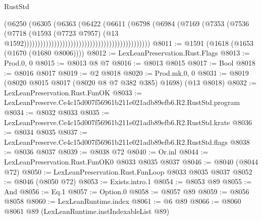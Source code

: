 \begin{lexlean}{RustStd}
\begin{coremodule}
                                                                      (@6250
                                                                        (@6305
                                                                          (@6363
                                                                            (@6422
                                                                              (@6611
                                                                                (@6798
                                                                                  (@6984
                                                                                    (@7169
                                                                                      (@7353
                                                                                        (@7536
                                                                                          (@7718
                                                                                            (@1593
                                                                                              (@7723
                                                                                                @7957)
                                                                                              (@13
                                                                                                @1592))))))))))))))))))))))))))))))))))))))))))))))
@8011 := @1591 (@1618 (@1653 (@1670 (@1680 @8006))))
@8012 := LexLeanPreservation.Rust.Flags
@8013 := Prod.{0, 0}
@8015 := @8013 @8 @7
@8016 := @8013 @8015
@8017 := Bool
@8018 := @8016 @8017
@8019 := @2 @8018
@8020 := Prod.mk.{0, 0}
@8031 := @8019 (@8020 @8015 @8017 (@8020 @8 @7 @382 @385) @1698) (@13 @8018)
@8032 := LexLeanPreservation.Rust.FunOK
@8033 := LexLeanPreserve.Ce4c15d007f56961b211e021adb89efb6.R2.RustStd.program
@8034 := @8032 @8033
@8035 := LexLeanPreserve.Ce4c15d007f56961b211e021adb89efb6.R2.RustStd.krate
@8036 := @8034 @8035
@8037 := LexLeanPreserve.Ce4c15d007f56961b211e021adb89efb6.R2.RustStd.flags
@8038 := @8036 @8037
@8039 := @8038 @72
@8040 := Or.inl
@8044 := LexLeanPreservation.Rust.FunOK0 @8033 @8035 @8037
@8046 := @8040 (@8044 @72)
@8050 := LexLeanPreservation.Rust.FunLoop @8033 @8035 @8037
@8052 := @8046 (@8050 @72)
@8053 := Exists.intro.{1}
@8054 := @8053 @89
@8055 := And
@8056 := Eq.{1}
@8057 := Option.{0}
@8058 := @8057 @89
@8059 := @8056 @8058
@8060 := LexLeanRuntime.index
@8061 := @6 @89
@8066 := @8060 @8061 @89 (LexLeanRuntime.instIndexableList @89)

\end{coremodule}
\end{lexlean}
